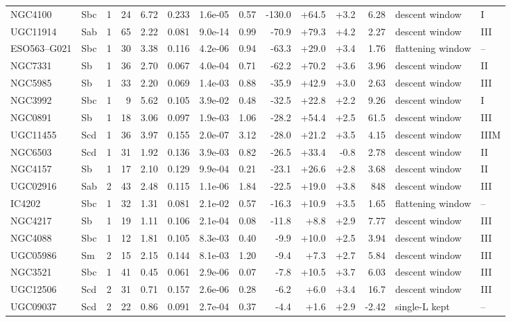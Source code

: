 \documentclass[10pt]{article}
\begin{document}
\begin{landscape}
{\begin{longtable}{lllrrrrrrrrrll}
NGC4100 & Sbc & 1 & 24 & 6.72 & 0.233 & 1.6e-05 & 0.57 & -130.0 & +64.5 & +3.2 & 6.28 & descent window & I\\
UGC11914 & Sab & 1 & 65 & 2.22 & 0.081 & 9.0e-14 & 0.99 & -70.9 & +79.3 & +4.2 & 2.27 & descent window & III\\
ESO563--G021 & Sbc & 1 & 30 & 3.38 & 0.116 & 4.2e-06 & 0.94 & -63.3 & +29.0 & +3.4 & 1.76 & flattening window & --\\
NGC7331 & Sb & 1 & 36 & 2.70 & 0.067 & 4.0e-04 & 0.71 & -62.2 & +70.2 & +3.6 & 3.96 & descent window & II\\
NGC5985 & Sb & 1 & 33 & 2.20 & 0.069 & 1.4e-03 & 0.88 & -35.9 & +42.9 & +3.0 & 2.63 & descent window & III\\
NGC3992 & Sbc & 1 & 9 & 5.62 & 0.105 & 3.9e-02 & 0.48 & -32.5 & +22.8 & +2.2 & 9.26 & descent window & I\\
NGC0891 & Sb & 1 & 18 & 3.06 & 0.097 & 1.9e-03 & 1.06 & -28.2 & +54.4 & +2.5 & 61.5 & descent window & III\\
UGC11455 & Scd & 1 & 36 & 3.97 & 0.155 & 2.0e-07 & 3.12 & -28.0 & +21.2 & +3.5 & 4.15 & descent window & IIIM\\
NGC6503 & Scd & 1 & 31 & 1.92 & 0.136 & 3.9e-03 & 0.82 & -26.5 & +33.4 & -0.8 & 2.78 & descent window & II\\
NGC4157 & Sb & 1 & 17 & 2.10 & 0.129 & 9.9e-04 & 0.21 & -23.1 & +26.6 & +2.8 & 3.68 & descent window & II\\
UGC02916 & Sab & 2 & 43 & 2.48 & 0.115 & 1.1e-06 & 1.84 & -22.5 & +19.0 & +3.8 & 848 & descent window & III\\
IC4202 & Sbc & 1 & 32 & 1.31 & 0.081 & 2.1e-02 & 0.57 & -16.3 & +10.9 & +3.5 & 1.65 & flattening window & --\\
NGC4217 & Sb & 1 & 19 & 1.11 & 0.106 & 2.1e-04 & 0.08 & -11.8 & +8.8 & +2.9 & 7.77 & descent window & III\\
NGC4088 & Sbc & 1 & 12 & 1.81 & 0.105 & 8.3e-03 & 0.40 & -9.9 & +10.0 & +2.5 & 3.94 & descent window & III\\
UGC05986 & Sm & 2 & 15 & 2.15 & 0.144 & 8.1e-03 & 1.20 & -9.4 & +7.3 & +2.7 & 5.84 & descent window & III\\
NGC3521 & Sbc & 1 & 41 & 0.45 & 0.061 & 2.9e-06 & 0.07 & -7.8 & +10.5 & +3.7 & 6.03 & descent window & III\\
UGC12506 & Scd & 2 & 31 & 0.71 & 0.157 & 2.6e-06 & 0.28 & -6.2 & +6.0 & +3.4 & 16.7 & descent window & III\\
UGC09037 & Scd & 2 & 22 & 0.86 & 0.091 & 2.7e-04 & 0.37 & -4.4 & +1.6 & +2.9 & -2.42 & single-L kept & --\\

\end{longtable}}
\end{landscape}
\end{document}
